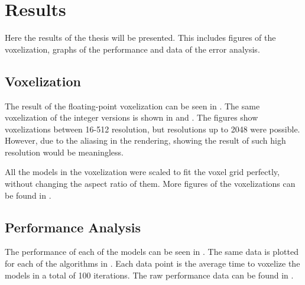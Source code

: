 \chapter{Results}\label{cha:results}
Here the results of the thesis will be presented.
This includes figures of the voxelization, graphs of the performance and data of the error analysis.

\section{Voxelization}
The result of the floating-point voxelization can be seen in .
The same voxelization of the integer versions is shown in  and .
The figures show voxelizations between 16-512 resolution, but resolutions up to 2048 were possible.
However, due to the aliasing in the rendering, showing the result of such high resolution would be meaningless.

All the models in the voxelization were scaled to fit the voxel grid perfectly, without changing the aspect ratio of them.
More figures of the voxelizations can be found in .

\section{Performance Analysis}
The performance of each of the models can be seen in .
The same data is plotted for each of the algorithms in .
Each data point is the average time to voxelize the models in a total of 100 iterations.
The raw performance data can be found in .

